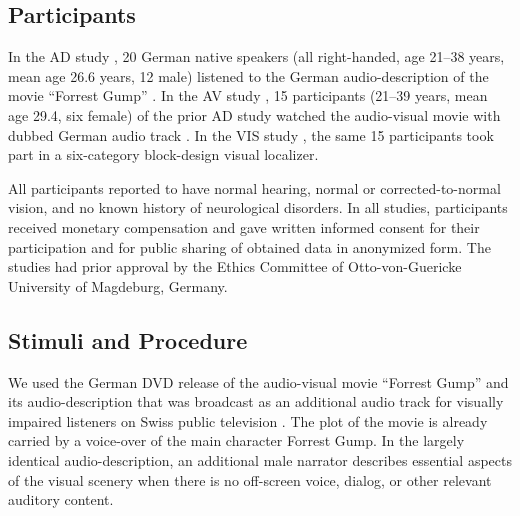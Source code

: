 \documentclass[english]{article}
\begin{document}
\subsection{Participants}
In the AD study \citep{hanke2014audiomovie}, 20 German native speakers (all
right-handed, age 21–38 years, mean age 26.6 years, 12 male) listened to the
German audio-description \citep{ForrestGumpGermanAD} of the movie ``Forrest
Gump'' \citep{ForrestGumpMovie}.
In the AV study \citep{hanke2016simultaneous}, 15 participants (21–39 years,
mean age 29.4, six female) of the prior AD study watched the audio-visual movie
with dubbed German audio track \citep{ForrestGumpDVD}.
In the VIS study \citep{sengupta2016extension}, the same 15 participants took
part in a six-category block-design visual localizer.

All participants reported to have normal hearing, normal or corrected-to-normal
vision, and no known history of neurological disorders.
In all studies, participants received monetary compensation and gave written
informed consent for their participation and for public sharing of obtained data
in anonymized form. The studies had prior approval by the Ethics Committee of
Otto-von-Guericke University of Magdeburg, Germany.


\subsection{Stimuli and Procedure}



We used the German DVD release \citep{ForrestGumpDVD} of the audio-visual movie
``Forrest Gump'' \citep{ForrestGumpMovie} and its audio-description that was
broadcast as an additional audio track for visually impaired listeners on Swiss
public television \citep{ForrestGumpGermanAD}.
The plot of the movie is already carried by a voice-over of the main character
Forrest Gump.
In the largely identical audio-description, an additional male narrator
describes essential aspects of the visual scenery when there is no off-screen
voice, dialog, or other relevant auditory content.
\end{document}

